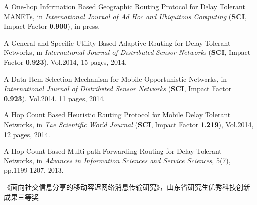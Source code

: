 \begin{publications}{99}
%
%

\item A One-hop Information Based Geographic Routing Protocol for Delay Tolerant MANETs, in \textit{International Journal of Ad Hoc and Ubiquitous Computing} (\textbf{SCI}, Impact Factor \textbf{0.900}), in press.


%

\item A General and Specific Utility Based Adaptive Routing for Delay Tolerant Networks, in \textit{International Journal of Distributed Sensor Networks} (\textbf{SCI}, Impact Factor \textbf{0.923}), Vol.2014, 15 pages, 2014.

%

\item A Data Item Selection Mechanism for Mobile Opportunistic Networks, in \textit{International Journal of Distributed Sensor Networks} (\textbf{SCI}, Impact Factor \textbf{0.923}), Vol.2014, 11 pages, 2014.

%

\item A Hop Count Based Heuristic Routing Protocol for Mobile Delay Tolerant Networks, in \textit{The Scientific World Journal} (\textbf{SCI}, Impact Factor \textbf{1.219}), Vol.2014, 12 pages, 2014.

%

\item A Hop Count Based Multi-path Forwarding Routing for Delay Tolerant Networks, in {\it Advances in Information Sciences and Service Sciences}, 5(7), pp.1199-1207, 2013.

\item 《面向社交信息分享的移动容迟网络消息传输研究》，山东省研究生优秀科技创新成果三等奖
    
\end{publications}


